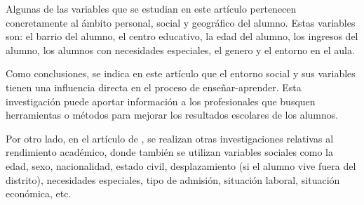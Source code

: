 Algunas de las variables que se estudian en este artículo pertenecen concretamente al ámbito personal, social y geográfico del alumno. Estas variables son: el barrio del alumno, el centro educativo, la edad del alumno, los ingresos del alumno, los alumnos con necesidades especiales, el genero y el entorno en el aula.

Como conclusiones, se indica en este artículo que el entorno social y sus variables tienen una influencia directa en el proceso de enseñar-aprender. Esta investigación puede aportar información a los profesionales que busquen herramientas o métodos para mejorar los resultados escolares de los alumnos.

Por otro lado, en el artículo de , se realizan otras investigaciones relativas al rendimiento académico, donde también se utilizan variables sociales como la edad, sexo, nacionalidad, estado civil, desplazamiento (si el alumno vive fuera del distrito), necesidades especiales, tipo de admisión, situación laboral, situación económica, etc.

